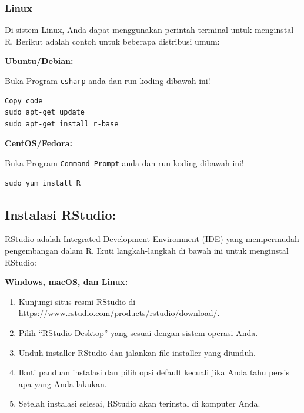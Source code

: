 \documentclass[
]{book}
\providecommand{\tightlist}{%
  \setlength{\itemsep}{0pt}\setlength{\parskip}{0pt}}
\begin{document}
\hypertarget{linux}{%
\subsubsection*{Linux}\label{linux}}

Di sistem Linux, Anda dapat menggunakan perintah terminal untuk menginstal R. Berikut adalah contoh untuk beberapa distribusi umum:

\textbf{Ubuntu/Debian:}

Buka Program \texttt{csharp} anda dan run koding dibawah ini!

\begin{verbatim}
Copy code
sudo apt-get update
sudo apt-get install r-base
\end{verbatim}

\textbf{CentOS/Fedora:}

Buka Program \texttt{Command\ Prompt} anda dan run koding dibawah ini!

\begin{verbatim}
sudo yum install R
\end{verbatim}

\hypertarget{instalasi-rstudio}{%
\subsection{Instalasi RStudio:}\label{instalasi-rstudio}}

RStudio adalah Integrated Development Environment (IDE) yang mempermudah pengembangan dalam R. Ikuti langkah-langkah di bawah ini untuk menginstal RStudio:

\textbf{Windows, macOS, dan Linux:}

\begin{enumerate}
\def\labelenumi{\arabic{enumi}.}
\tightlist
\item
  Kunjungi situs resmi RStudio di \url{https://www.rstudio.com/products/rstudio/download/}.
\item
  Pilih ``RStudio Desktop'' yang sesuai dengan sistem operasi Anda.
\item
  Unduh installer RStudio dan jalankan file installer yang diunduh.
\item
  Ikuti panduan instalasi dan pilih opsi default kecuali jika Anda tahu persis apa yang Anda lakukan.
\item
  Setelah instalasi selesai, RStudio akan terinstal di komputer Anda.
\end{enumerate}
\end{document}
